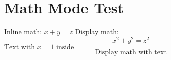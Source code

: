 \documentclass{article}
\begin{document}
\section{Math Mode Test}
Inline math: $x + y = z$
Display math: $$x^2 + y^2 = z^2$$
$\text{Text with } x = 1 \text{ inside}$
\[
\text{Display math with text}
\]
\end{document}
